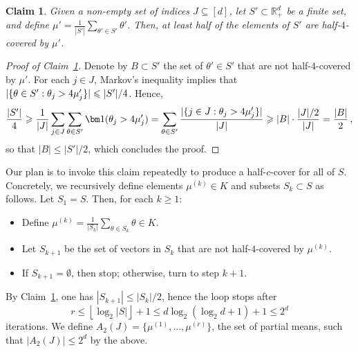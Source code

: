 \documentclass[11pt]{article}
\newcommand{\R}{\mathbb R}
\renewcommand{\leq}{\leqslant}
\renewcommand{\geq}{\geqslant}
\newcommand{\ind}[1]{\bm 1 ( #1 )}
\newtheorem{claim}{Claim}
\theoremstyle{definition}
\theoremstyle{remark}
\DeclarePairedDelimiter{\abs}{\lvert}{\rvert}
\DeclarePairedDelimiter{\set}{\{}{\}}
\begin{document}
  \begin{claim}
    \label{cla:half-cover-mean}
    Given a non-empty set of indices $J \subseteq [d]$, let $S' \subset \R_+^d$ be a finite set, and define $\mu' = \frac{1}{|S'|} \sum_{\theta' \in S'} \theta'$.
    Then, at least half of the elements of $S'$ are half-$4$-covered by $\mu'$.
  \end{claim}

  \begin{proof}[Proof of Claim~\ref{cla:half-cover-mean}]
    Denote by $B \subset S'$ the set of $\theta' \in S'$ that are not half-$4$-covered by $\mu'$.
    For each $j \in J$, Markov's inequality implies that $|\set{\theta \in S' : \theta_j > 4 \mu'_j}| \leq |S'|/4$.
    Hence,
    \begin{equation*}
      \frac{|S'|}{4}
      \geq \frac{1}{|J|} \sum_{j \in J} \sum_{\theta \in S'} \ind{\theta_j > 4 \mu'_j}
      = \sum_{\theta \in S'} \frac{\abs{\set{j \in J : \theta_j > 4 \mu_j'}}}{|J|}
      \geq |B| \cdot \frac{|J|/2}{|J|}
      = \frac{|B|}{2}
      \, ,
    \end{equation*}
    so that $|B| \leq |S'|/2$, which concludes the proof.
  \end{proof}
  Our plan is to invoke this claim repeatedly to produce a half-$c$-cover for all of $S$. Concretely, we recursively define elements $\mu^{(k)} \in K$ and subsets $S_k \subset S$ as follows. Let $S_1 = S$. Then, for each $k \geq 1$:
  \begin{itemize}
  \item Define $\mu^{(k)} = \frac{1}{|S_k|} \sum_{\theta \in S_k} \theta \in K$.
  \item Let $S_{k+1}$ be the set of vectors in $S_k$ that are not half-$4$-covered by $\mu^{(k)}$.
  \item If $S_{k+1} = \emptyset$, then stop; otherwise, turn to step $k+1$.
  \end{itemize}
  By Claim~\ref{cla:half-cover-mean}, one has $|S_{k+1}| \leq |S_k|/2$, hence the loop stops after
  \begin{equation*}
    r \leq \left\lfloor \log_2 |S| \right\rfloor + 1 \leq d \log_2 (\log_2 d + 1) + 1
    \leq 2^d
  \end{equation*}
  iterations.
  We define $A_2 (J) = \{ \mu^{(1)}, \dots, \mu^{(r)} \}$, the set of partial means, such that $|A_2(J)| \leq 2^d$ by the above.
  
\end{document}

